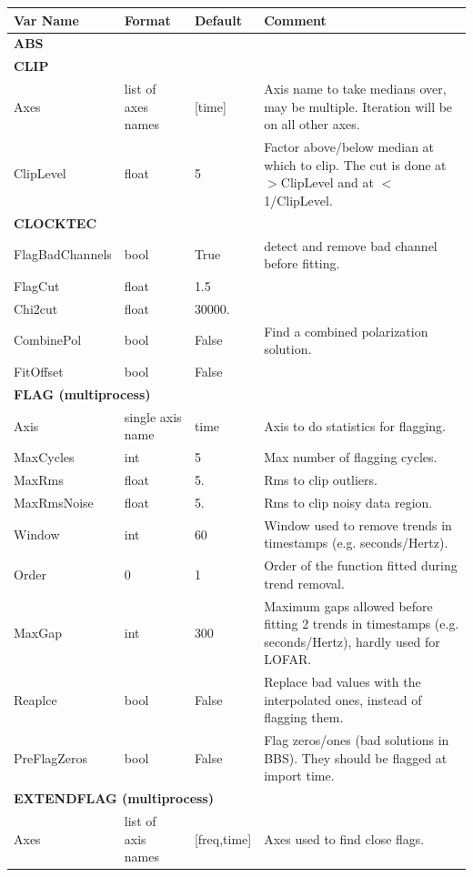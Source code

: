 \begin{longtable}{l p{3cm} l p{8cm}}
\hline
\hline
Var Name & Format & Default & Comment\\
\hline
\multicolumn{4}{l}{\textbf{ABS}}\\
\hline
\multicolumn{4}{l}{\textbf{CLIP}}\\
Axes & list of axes names & [time] & Axis name to take medians over, may be multiple. Iteration will be on all other axes.\\
ClipLevel & float & 5 & Factor above/below median at which to clip. The cut is done at $>$ClipLevel and at $<$1/ClipLevel.\\
\hline
\multicolumn{4}{l}{\textbf{CLOCKTEC}}\\
FlagBadChannels & bool & True & detect and remove bad channel before fitting.\\
FlagCut & float & 1.5 & \\
Chi2cut & float & 30000. & \\
CombinePol & bool & False & Find a combined polarization solution.\\
FitOffset & bool & False & \\
\hline
\multicolumn{4}{l}{\textbf{FLAG (multiprocess)}}\\
Axis & single axis name & time & Axis to do statistics for flagging.\\
MaxCycles & int & 5 & Max number of flagging cycles.\\
MaxRms & float & 5. & Rms to clip outliers.\\
MaxRmsNoise & float & 5. & Rms to clip noisy data region.\\
Window & int & 60 & Window used to remove trends in timestamps (e.g. seconds/Hertz).\\
Order & 0\textbar1\textbar2 & 1 & Order of the function fitted during trend removal.\\
MaxGap & int & 300 & Maximum gaps allowed before fitting 2 trends in timestamps (e.g. seconds/Hertz), hardly used for LOFAR.\\
Reaplce & bool & False & Replace bad values with the interpolated ones, instead of flagging them.\\
PreFlagZeros & bool & False & Flag zeros/ones (bad solutions in BBS). They should be flagged at import time.\\
\hline
\multicolumn{4}{l}{\textbf{EXTENDFLAG (multiprocess)}}\\
Axes & list of axis names & [freq,time] & Axes used to find close flags.\\

\end{longtable}
